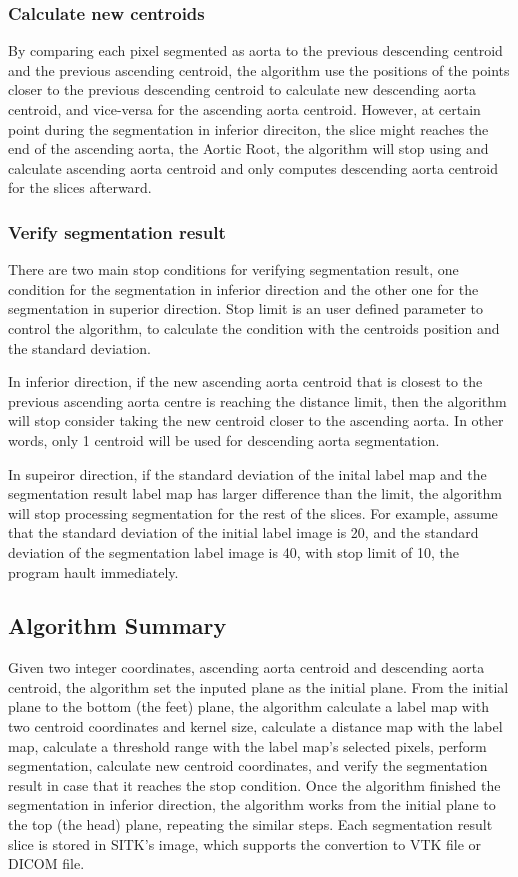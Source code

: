 \subsubsection{Calculate new centroids}
By comparing each pixel segmented as aorta to the previous descending centroid and the previous ascending centroid, the algorithm use the positions of the points closer to the previous descending centroid to calculate new descending aorta centroid, and vice-versa for the ascending aorta centroid. However, at certain point during the segmentation in inferior direciton, the slice might reaches the end of the ascending aorta, the Aortic Root, the algorithm will stop using and calculate ascending aorta centroid and only computes descending aorta centroid for the slices afterward.

\subsubsection{Verify segmentation result}
There are two main stop conditions for verifying segmentation result, one condition for the segmentation in inferior direction and the other one for the segmentation in superior direction. Stop limit is an user defined parameter to control the algorithm, to calculate the condition with the centroids position and the standard deviation.

In inferior direction, if the new ascending aorta centroid that is closest to the previous ascending aorta centre is reaching the distance limit, then the algorithm will stop consider taking the new centroid closer to the ascending aorta. In other words, only 1 centroid will be used for descending aorta segmentation.

In supeiror direction, if the standard deviation of the inital label map and the segmentation result label map has larger difference than the limit, the algorithm will stop processing segmentation for the rest of the slices. For example, assume that the standard deviation of the initial label image is 20, and the standard deviation of the segmentation label image is 40, with stop limit of 10, the program hault immediately.

\subsection{Algorithm Summary}
Given two integer coordinates, ascending aorta centroid and descending aorta centroid, the algorithm set the inputed plane as the initial plane. From the initial plane to the bottom (the feet) plane, the algorithm calculate a label map with two centroid coordinates and kernel size, calculate a distance map with the label map, calculate a threshold range with the label map's selected pixels, perform segmentation, calculate new centroid coordinates, and verify the segmentation result in case that it reaches the stop condition. Once the algorithm finished the segmentation in inferior direction, the algorithm works from the initial plane to the top (the head) plane, repeating the similar steps. Each segmentation result slice is stored in SITK's image, which supports the convertion to VTK file or DICOM file.

